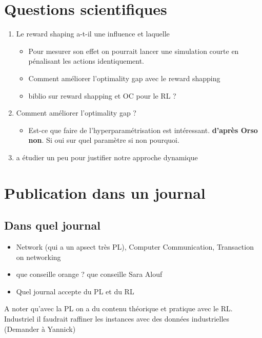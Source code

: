 \documentclass[12pt,a4paper]{article}
\begin{document}
\section*{Questions scientifiques}

\begin{enumerate}
    \item[]   [Reward Shapping]  Le reward shaping a-t-il une influence et laquelle
          \begin{itemize}
              \item Pour mesurer son effet on pourrait lancer une simulation courte en pénalisant les actions identiquement.
              \item Comment améliorer l'optimality gap avec le reward shapping
              \item biblio sur reward shapping et OC pour le RL ?
          \end{itemize}
    \item[] [Optimality Gap] Comment améliorer l'optimality gap ?
          \begin{itemize}
              \item Est-ce que faire de l'hyperparamétrisation est intéressant. \textbf{d'après Orso non}. Si oui sur quel paramètre si non pourquoi.
          \end{itemize}
    \item[] [Transfert Learning] a étudier un peu pour justifier notre approche dynamique
\end{enumerate}


\section*{Publication dans un journal}

\subsection*{Dans quel journal}

\begin{itemize}
    \item Network (qui a un apsect très PL), Computer Communication, Transaction on networking
    \item que conseille orange ? que conseille Sara Alouf
    \item Quel journal accepte du PL et du RL
\end{itemize}

A noter qu'avec la PL on a du contenu théorique et pratique avec le RL. Industriel il faudrait raffiner les instances avec des données industrielles (Demander à Yannick)
\end{document}
